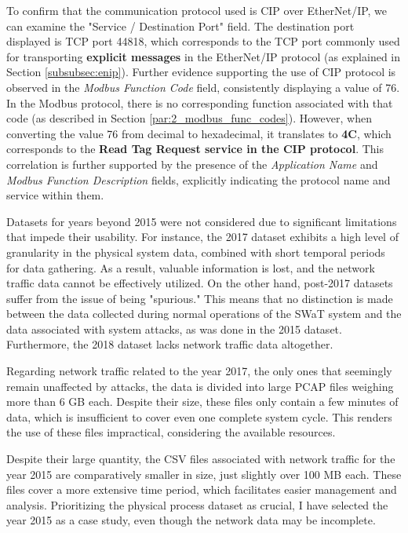 To confirm that the communication protocol used is CIP over EtherNet/IP, we can examine the "Service / Destination Port" field. The destination port displayed is TCP port 44818, which corresponds to the TCP port commonly used for transporting \textbf{explicit messages} in the EtherNet/IP protocol (as explained in Section \ref{subsubsec:enip}).
Further evidence supporting the use of CIP protocol is observed in the \textit{Modbus Function Code} field, consistently displaying a value of 76. In the Modbus protocol, there is no corresponding function associated with that code (as described in Section \ref{par:2_modbus_func_codes}). However, when converting the value 76 from decimal to hexadecimal, it translates to \textbf{4C}, which corresponds to the \textbf{Read Tag Request service in the CIP protocol}. This correlation is further supported by the presence of the \textit{Application Name} and \textit{Modbus Function Description} fields, explicitly indicating the protocol name and service within them.

\bigskip
Datasets for years beyond 2015 were not considered due to significant limitations that impede their usability. For instance, the 2017 dataset exhibits a high level of granularity in the physical system data, combined with short temporal periods for data gathering. As a result, valuable information is lost, and the network traffic data cannot be effectively utilized. On the other hand, post-2017 datasets suffer from the issue of being "spurious." This means that no distinction is made between the data collected during normal operations of the SWaT system and the data associated with system attacks, as was done in the 2015 dataset. Furthermore, the 2018 dataset lacks network traffic data altogether.

Regarding network traffic related to the year 2017, the only ones that seemingly remain unaffected by attacks, the data is divided into large PCAP files weighing more than 6 GB each. Despite their size, these files only contain a few minutes of data, which is insufficient to cover even one complete system cycle. This renders the use of these files impractical, considering the available resources.

\bigskip
Despite their large quantity, the CSV files associated with network traffic for the year 2015 are comparatively smaller in size, just slightly over 100 MB each. These files cover a more extensive time period, which facilitates easier management and analysis. Prioritizing the physical process dataset as crucial, I have selected the year 2015 as a case study, even though the network data may be incomplete.

\vfill
\nolinenumbers